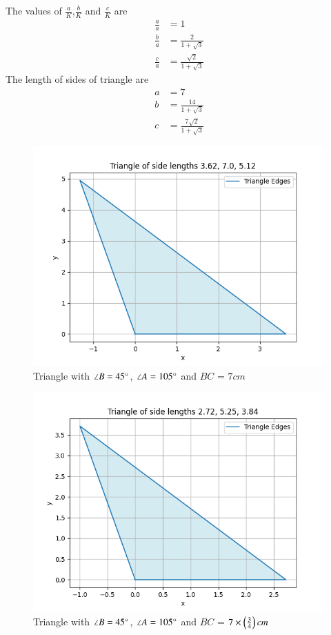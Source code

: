 \documentclass[journal]{IEEEtran}
\begin{document}
The values of $\frac{a}{K}$,$\frac{b}{K}$ and $\frac{c}{K}$ are
\begin{align}
\frac{a}{a}&=1\\
\frac{b}{a}&=\frac{2}{1+\sqrt{3}}\\
\frac{c}{a}&=\frac{\sqrt{2}}{1+\sqrt{3}}
\end{align}
The length of sides of triangle are
\begin{align}
a&=7\\
b&=\frac{14}{1+\sqrt{3}}\\
c&=\frac{7\sqrt{2}}{1+\sqrt{3}}
\end{align}
\begin{figure}[h!]
   \centering
   \includegraphics[width=0.7\linewidth]{figs/fig1.png}
   \caption{Triangle with $\angle B=45\degree$, $\angle A=105\degree$ and $BC$ = $7cm$}
\end{figure}

\begin{figure}[h!]
   \centering
   \includegraphics[width=0.7\linewidth]{figs/fig2.png}
   \caption{Triangle with $\angle B=45\degree$, $\angle A=105\degree$ and $BC$ = $7\times\left(\frac{3}{4}\right)cm$}
\end{figure}
\end{document}
